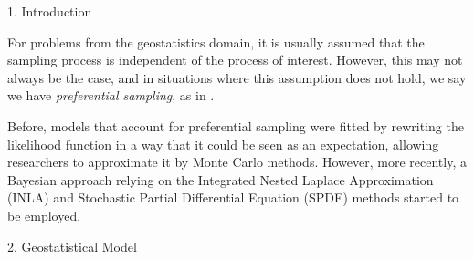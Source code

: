 \documentclass[12pt]{beamer}
\begin{document}
	\begin{frame}[t]
		\begin{columns}[t]
			\begin{column}{0.30\textwidth} \justifying %
			\begin{block}{\Large 1. Introduction} \justifying \vspace{12pt}				

			For problems from the geostatistics domain, it is usually assumed that the sampling process is independent of the process of interest. However, this may not always be the case, and in situations where this assumption does not hold, we say we have \textit{preferential sampling}, as in \cite{diggle2010geostatistical}.\vspace{18pt}
			
			
			Before, models that account for preferential sampling were fitted by rewriting the likelihood function in a way that it could be seen as an expectation, allowing researchers to approximate it by Monte Carlo methods. However, more recently, a Bayesian approach relying on the Integrated Nested Laplace Approximation (INLA) and Stochastic Partial Differential Equation (SPDE) methods started to be employed.\vspace{18pt}
			
			\end{block}
		
			\begin{block}{\Large 2. Geostatistical Model} \justifying \vspace{12pt}				
				
				

\end{block}
\end{column}
\end{columns}
\end{frame}
\end{document}
